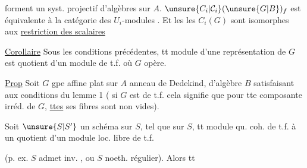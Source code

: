
forment un syst. projectif  d'algèbres sur $A$. $\unsure{C_i|\mathcal C_i}(\unsure{G|B})_f$ est équivalente  à la catégorie des $U_i$-modules . Et les    les $C_i(G)$ sont isomorphes aux   \uline{restriction des scalaires}

\margin{\rule{.04em}{2.6em}}\uline{Corollaire} Sous les conditions précédentes, tt module  d'une représentation de $G$ est quotient d'un module  de t.f. où $G$ opère.

\uline{Prop} Soit $G$ gpe affine plat sur $A$ anneau de Dedekind, d'algèbre $B$ satisfaisant aux conditions du lemme 1 ( si $G$ est de t.f. cela signifie que pour tte composante irréd. de $G$, \uline{ttes} ses fibres sont non vides).

Soit  $\unsure{S|S'}$ un schéma sur $S$, tel que sur $S$, tt module qu. coh. de t.f.   à un quotient d'un module loc. libre de t.f.

 (p. ex. $S$ admet  inv. , ou $S$ noeth. régulier). Alors tt
